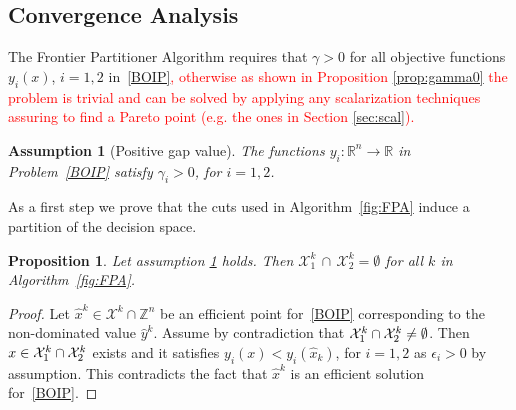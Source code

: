 \documentclass[preprint,12pt]{elsarticle}
\newcommand{\red}[1]{\textcolor{red}{#1}}
\newtheorem{proposition}[theorem]{Proposition}
\newtheorem{assumption}[theorem]{Assumption}
\def\X{{\cal X}}
\def\R{\mathbb{R}}
\def\Z{\mathbb{Z}}
\begin{document}
\subsection{Convergence Analysis}\label{sec:conv}
The Frontier Partitioner Algorithm requires that $\gamma>0$ for all objective functions $y_i(x)$, $i=1,2$ in~\eqref{BOIP}\red{, otherwise as shown in Proposition \ref{prop:gamma0} the problem is trivial and can be solved by applying any scalarization techniques assuring to find a Pareto point (e.g. the ones in Section \ref{sec:scal}).}

\begin{assumption}[Positive gap value]\label{ass:gamma}
The functions $y_i:\R^n\rightarrow \R$ in Problem~\eqref{BOIP} satisfy $\gamma_i>0$, for $i=1,2$.
\end{assumption}
As a first step we prove that the cuts used in Algorithm~\ref{fig:FPA} induce a partition of the decision space.

\begin{proposition}\label{prop:part}
Let assumption \ref{ass:gamma} holds.
 Then $\mathcal{X}^k_1\,\cap \,\mathcal{X}^k_2 = \emptyset$ for all $k$ in Algorithm~\ref{fig:FPA}.
\end{proposition}
\begin{proof}
 Let $\hat x^k\in \mathcal{X}^k\cap \Z^n$ be an efficient point for~\eqref{BOIP} corresponding to the non-dominated value $\hat y^k$. Assume by contradiction that $ \X^{k}_1 \cap \X^{k}_2 \neq \emptyset$.
 Then $x \in \X^{k}_1 \cap \X^{k}_2$ exists and it satisfies $y_i(x) <y_i(\hat{x}_k)$, for $i=1,2$ as $\epsilon_i>0$ by assumption. This contradicts the fact that
 $\hat x^k$ is an efficient solution for~\eqref{BOIP}.
\end{proof}
\end{document}

